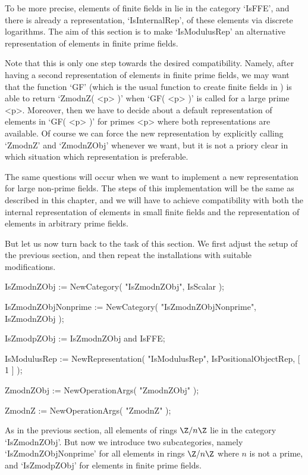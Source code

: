 To be more precise,
elements of finite fields in {\GAP} lie in the category `IsFFE',
and there is already a representation, `IsInternalRep', of these elements
via discrete logarithms.
The aim of this section is to make `IsModulusRep' an alternative
representation of elements in finite prime fields.

Note that this is only one step towards the desired compatibility.
Namely, after having a second representation of elements in finite
prime fields, we may want that the function `GF' (which is the usual
function to create finite fields in {\GAP}) is able to return
`ZmodnZ( <p> )' when `GF( <p> )' is called for a large prime <p>.
Moreover, then we have to decide about a default representation of
elements in `GF( <p> )' for primes <p> where both representations are
available.
Of course we can force the new representation by explicitly calling
`ZmodnZ' and `ZmodnZObj' whenever we want, but it is not a priory
clear in which situation which representation is preferable.

The same questions will occur when we want to implement a new
representation for large non-prime fields.
The steps of this implementation will be the same as described in this
chapter,
and we will have to achieve compatibility with both the internal
representation of elements in small finite fields and the representation
of elements in arbitrary prime fields.

But let us now turn back to the task of this section.
We first adjust the setup of the previous section,
and then repeat the installations with suitable modifications.

\begintt
    IsZmodnZObj := NewCategory( "IsZmodnZObj", IsScalar );

    IsZmodnZObjNonprime := NewCategory( "IsZmodnZObjNonprime",
        IsZmodnZObj );

    IsZmodpZObj := IsZmodnZObj and IsFFE;

    IsModulusRep := NewRepresentation( "IsModulusRep",
        IsPositionalObjectRep,
        [ 1 ] );

    ZmodnZObj := NewOperationArgs( "ZmodnZObj" );

    ZmodnZ := NewOperationArgs( "ZmodnZ" );
\endtt

As in the previous section,
all elements of rings $\Z/n\Z$ lie in the category `IsZmodnZObj'.
But now we introduce two subcategories, namely `IsZmodnZObjNonprime'
for all elements in rings $\Z/n\Z$ where $n$ is not a prime,
and `IsZmodpZObj' for elements in finite prime fields.

